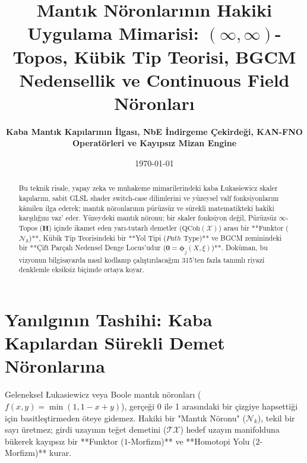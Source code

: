 \documentclass[11pt, a4paper]{article}
\title{\textbf{Mantık Nöronlarının Hakiki Uygulama Mimarisi: $(\infty, \infty)$-Topos, Kübik Tip Teorisi, BGCM Nedensellik ve Continuous Field Nöronları}}
\author{\textbf{Kaba Mantık Kapılarının İlgası, NbE İndirgeme Çekirdeği, KAN-FNO Operatörleri ve Kayıpsız Mizan Engine}}
\date{\today}
\begin{document}
\maketitle

\begin{abstract}
Bu teknik risale, yapay zeka ve muhakeme mimarilerindeki kaba Łukasiewicz skaler kapılarını, sabit GLSL shader switch-case dilimlerini ve yüzeysel valf fonksiyonlarını kâmilen ilga ederek; mantık nöronlarının pürüzsüz ve sürekli matematikteki hakiki karşılığını vaz' eder. Yüzeydeki mantık nöronu; bir skaler fonksiyon değil, Pürüzsüz $\infty$-Topos ($\mathbf{H}$) içinde ikamet eden yarı-tutarlı demetler ($\text{QCoh}(\mathcal{X})$) arası bir **Funktor ($\mathcal{N}_k$)**, Kübik Tip Teorisindeki bir **Yol Tipi ($Path\text{ Type}$)** ve BGCM zeminindeki bir **Çift Parçalı Nedensel Denge Locus'udur ($\mathbf{0} = \bm{\phi}_j(X, \xi)$)**. Doküman, bu vizyonun bilgisayarda nasıl kodlanıp çalıştırılacağını 315'ten fazla tanımlı riyazî denklemle eksiksiz biçimde ortaya koyar.
\end{abstract}

\section{Yanılgının Tashihi: Kaba Kapılardan Sürekli Demet Nöronlarına}

Geleneksel Łukasiewicz veya Boole mantık nöronları ($f(x, y) = \min(1, 1-x+y)$), gerçeği 0 ile 1 arasındaki bir çizgiye hapsettiği için basitleştirmeden öteye gidemez. Hakiki bir "Mantık Nöronu" ($\mathcal{N}_k$), tekil bir sayı üretmez; girdi uzayının teğet demetini ($\mathcal{T}\mathcal{X}$) hedef uzayın manifolduna bükerek kayıpsız bir **Funktor ($1$-Morfizm)** ve **Homotopi Yolu ($2$-Morfizm)** kurar.
\end{document}
